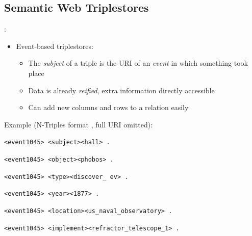 \documentclass[logoontitle,tabu,supertabular,aspectratio=43]{preney-uwindsor-beamer}
\begin{document}
    \subsection{Semantic Web Triplestores}
    \begin{frame}{\insertsection: \insertsubsection}
        \begin{itemize}
            \item Event-based triplestores:
            \begin{itemize}
                \item The {\em subject} of a triple is the URI of an \textit{event} in which something took place
                \item Data is already {\em reified}, extra information directly accessible
                \item Can add new columns and rows to a relation easily
            \end{itemize}
        \end{itemize}

        Example (N-Triples format \cite{w3cntriples}, full URI omitted):
        \begin{block}{}
            \hspace{5em}\texttt{<event1045> <subject>\phantom{qqq}<hall> .}

            \hspace{5em}\texttt{<event1045> <object>\phantom{qqqq}<phobos> .}

            \hspace{5em}\texttt{<event1045> <type>\phantom{qqqqqq}<discover\_ ev> .}

            \hspace{5em}\texttt{<event1045> <year>\phantom{qqqqqq}<1877> .}

            \hspace{5em}\texttt{<event1045> <location>\phantom{qq}<us\_naval\_observatory> .}

            \hspace{5em}\texttt{<event1045> <implement>\phantom{q}<refractor\_telescope\_1> .}
        \end{block}

    \end{frame}
\end{document}
